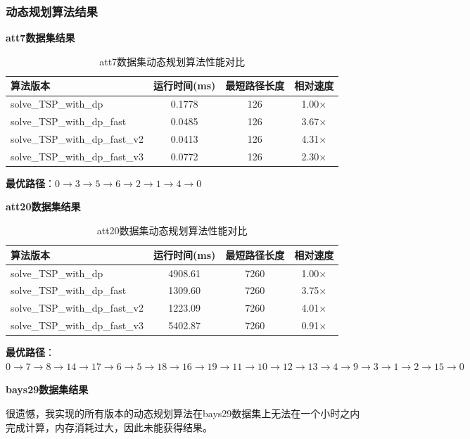 \documentclass[UTF8,12pt,a4paper]{ctexart}
\begin{document}
\subsubsection{动态规划算法结果}

\textbf{att7数据集结果}

\begin{table}[H]
	\centering
	\begin{tabular}{lccc}
		\toprule
		算法版本 & 运行时间(ms) & 最短路径长度 & 相对速度 \\
		\midrule
		solve\_TSP\_with\_dp & 0.1778 & 126 & 1.00$\times$ \\
		solve\_TSP\_with\_dp\_fast & 0.0485 & 126 & 3.67$\times$ \\
		solve\_TSP\_with\_dp\_fast\_v2 & 0.0413 & 126 & 4.31$\times$ \\
		solve\_TSP\_with\_dp\_fast\_v3 & 0.0772 & 126 & 2.30$\times$ \\
		\bottomrule
	\end{tabular}
	\caption{att7数据集动态规划算法性能对比}
\end{table}

\textbf{最优路径}：$0 \to 3 \to 5 \to 6 \to 2 \to 1 \to 4 \to 0$

\textbf{att20数据集结果}

\begin{table}[H]
	\centering
	\begin{tabular}{lccc}
		\toprule
		算法版本 & 运行时间(ms) & 最短路径长度 & 相对速度 \\
		\midrule
		solve\_TSP\_with\_dp & 4908.61 & 7260 & 1.00$\times$ \\
		solve\_TSP\_with\_dp\_fast & 1309.60 & 7260 & 3.75$\times$ \\
		solve\_TSP\_with\_dp\_fast\_v2 & 1223.09 & 7260 & 4.01$\times$ \\
		solve\_TSP\_with\_dp\_fast\_v3 & 5402.87 & 7260 & 0.91$\times$ \\
		\bottomrule
	\end{tabular}
	\caption{att20数据集动态规划算法性能对比}
\end{table}

\textbf{最优路径}：$0 \to 7 \to 8 \to 14 \to 17 \to 6 \to 5 \to 18 \to 16 \to 19 \to 11 \to 10 \to 12 \to 13 \to 4 \to 9 \to 3 \to 1 \to 2 \to 15 \to 0$

\textbf{bays29数据集结果}

很遗憾，我实现的所有版本的动态规划算法在bays29数据集上无法在一个小时之内完成计算，内存消耗过大，因此未能获得结果。
\end{document}
